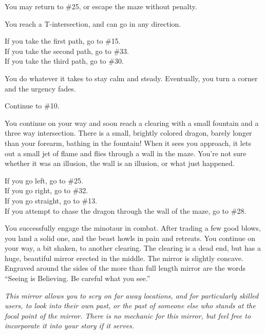 \documentclass[green]{gl2018}
\begin{document}
\begin{large}
\begin{location}{12}
\begin{fromhere}
You may return to \#25, or escape the maze without penalty.
\end{fromhere} 
\end{location}
\begin{location}{13}
You reach a T-intersection, and can go in any direction.
\begin{fromhere}
  If you take the first path, go to \#15.\\
 If you take the second path, go to \#33.\\
 If you take the third path, go to \#30.
\end{fromhere}
\end{location}
\begin{location}{14}
You do whatever it takes to stay calm and steady.  Eventually, you turn a corner and the urgency fades. 
\begin{fromhere}Continue to \#10.\end{fromhere}\end{location}
\begin{location}{15}
You continue on your way and soon reach a clearing with a small fountain and a three way intersection.  There is a small, brightly colored dragon, barely longer than your forearm, bathing in the fountain!  When it sees you approach, it lets out a small jet of flame and flies through a wall in the maze.  You're not sure whether it was an illusion, the wall is an illusion, or what just happened.

\begin{fromhere}
   If you go left, go to \#25.\\
 If you go right, go to \#32.\\ 
If you go straight, go to \#13.\\
If you attempt to chase the dragon through the wall of the maze, go to \#28.
\end{fromhere}
\end{location}
\begin{location}{16}
You successfully engage the minotaur in combat. After trading a few good blows, you land a solid one, and the beast howls in pain and retreats. You continue on your way, a bit shaken, to another clearing. The clearing is a dead end, but has a huge, beautiful mirror erected in the middle. The mirror is slightly concave. Engraved around the sides of the more than full length mirror are the words ``Seeing is Believing. Be careful what you see.''

\emph{This mirror allows you to scry on far away locations, and for particularly skilled users, to look into their own past, or the past of someone else who stands at the focal point of the mirror. There is no mechanic for this mirror, but feel free to incorporate it into your story if it serves.}


\end{location}
\end{large}
\end{document}
